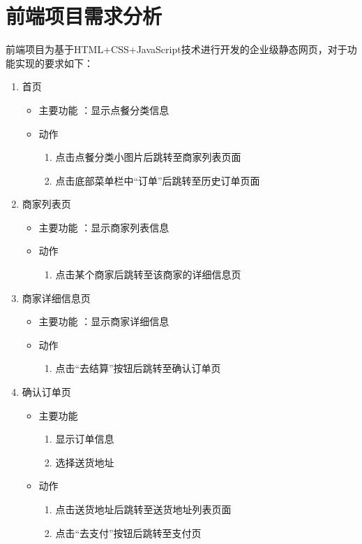\section{前端项目需求分析}
前端项目为基于HTML+CSS+JavaScript技术进行开发的企业级静态网页，对于功能实现的要求如下：
\begin{enumerate}
    \item 首页
    \begin{itemize}
        \item {主要功能} ：显示点餐分类信息
        \item 动作
        \begin{enumerate}
            \item 点击点餐分类小图片后跳转至商家列表页面
            \item 点击底部菜单栏中“订单”后跳转至历史订单页面
        \end{enumerate}
    \end{itemize}

    \item 商家列表页
    \begin{itemize}
        \item {主要功能} ：显示商家列表信息
        \item 动作
        \begin{enumerate}
            \item 点击某个商家后跳转至该商家的详细信息页
        \end{enumerate}
    \end{itemize}

    \item 商家详细信息页
    \begin{itemize}
        \item {主要功能} ：显示商家详细信息
        \item 动作
        \begin{enumerate}
            \item 点击“去结算”按钮后跳转至确认订单页
        \end{enumerate}
    \end{itemize}

    \item 确认订单页
    \begin{itemize}
        \item {主要功能} 
        \begin{enumerate}
            \item 显示订单信息
            \item 选择送货地址
        \end{enumerate}
        \item 动作\begin{enumerate}
            \item 点击送货地址后跳转至送货地址列表页面
            \item 点击“去支付”按钮后跳转至支付页
        \end{enumerate}
    \end{itemize}


\end{enumerate}
